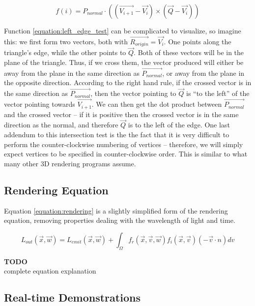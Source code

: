 \documentclass[11pt]{article}
\newcommand{\rayorg}{\vec{R_{origin}}}
\newcommand\todo[1]{
\begin{center}
  \color{red}
  {\bf TODO}\\
  #1
\end{center}
}
\begin{document}
\begin{equation}
  \label{equation:left_edge_test}
  f(i) = P_{normal} \cdot ((\vec{V_{i+1}} - \vec{V_i}) \times (\vec{Q} - \vec{V_i}))
\end{equation}

Function \ref{equation:left_edge_test} can be complicated to visualize, so imagine this: we first form two vectors, both with $\rayorg = \vec{V_i}$.
One points along the triangle's edge, while the other points to $\vec{Q}$.
Both of these vectors will be in the plane of the triangle.
Thus, if we cross them, the vector produced will either be away from the plane in the same direction as $\vec{P_{normal}}$, or away from the plane in the opposite direction.
According to the right hand rule, if the crossed vector is in the same direction as $\vec{P_{normal}}$, then the vector pointing to $\vec{Q}$ is ``to the left'' of the vector pointing towards $\vec{V_{i+1}}$.
We can then get the dot product between $\vec{P_{normal}}$ and the crossed vector -- if it is positive then the crossed vector is in the same direction as the normal, and therefore $\vec{Q}$ is to the left of the edge.
One last addendum to this intersection test is the the fact that it is very difficult to perform the counter-clockwise numbering of vertices -- therefore, we will simply expect vertices to be specified in counter-clockwise order.
This is similar to what many other 3D rendering programs assume.

\subsection{Rendering Equation}
\label{sec:method:rendering_equation}
Equation \ref{equation:rendering} is a slightly simplified form of the rendering equation, removing properties dealing with the wavelength of light and time.

\begin{equation}
  \label{equation:rendering}
  L_{out}(\vec{x}, \vec{w}) = L_{emit}(\vec{x}, \vec{w}) + \int_{\Omega} f_r(\vec{x}, \vec{v},\vec{w})f_i(\vec{x}, \vec{v})(-\vec{v} \cdot n) dv
\end{equation}

\todo{complete equation explanation}

\subsection{Real-time Demonstrations}
\label{sec:method:realtime_demo}
\end{document}
